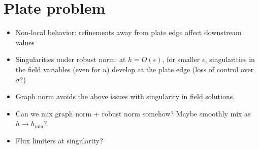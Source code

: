 \documentclass[11pt,onecolumn]{scrartcl}
\newcommand{\nor}[1]{\left\| #1 \right\|}
\newcommand{\LRp}[1]{\left( #1 \right)}
\newcommand{\LRc}[1]{\left\{ #1 \right\}}
\newcommand{\LRb}[1]{\left| #1 \right|}
\renewcommand{\L}{L^2\LRp{\Omega}}
\newcommand{\grad}{\nabla}
\renewcommand{\div}{\grad \cdot}
\begin{document}
%

\section{Plate problem}
\begin{itemize}
\item Non-local behavior: refinements away from plate edge affect downstream values
\item Singularities under robust norm: at $h = O(\epsilon)$, for smaller $\epsilon$, singularities in the field variables (even for $u$) develop at the plate edge (loss of control over $\sigma$?)  
\item Graph norm avoids the above issues with singularity in field solutions.  
\item Can we mix graph norm + robust norm somehow?  Maybe smoothly mix as $h\rightarrow h_{\min}$?
\item Flux limiters at singularity?
\end{itemize}





\end{document}
